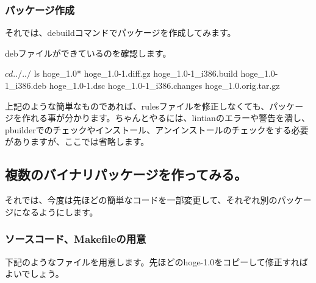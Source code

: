 \documentclass[mingoth,a4paper]{jsarticle}
\begin{document}
\subsubsection{パッケージ作成}
それでは、debuildコマンドでパッケージを作成してみます。

debファイルができているのを確認します。
\begin{commandline}
$ cd ../../
$ ls hoge_1.0*
hoge_1.0-1.diff.gz  hoge_1.0-1_i386.build    hoge_1.0-1_i386.deb
hoge_1.0-1.dsc      hoge_1.0-1_i386.changes  hoge_1.0.orig.tar.gz
\end{commandline}

上記のような簡単なものであれば、rulesファイルを修正しなくても、パッケー
ジを作れる事が分かります。ちゃんとやるには、lintianのエラーや警告を潰し、
pbuilderでのチェックやインストール、アンインストールのチェックをする必要
がありますが、ここでは省略します。

\subsection{複数のバイナリパッケージを作ってみる。}
それでは、今度は先ほどの簡単なコードを一部変更して、それぞれ別のパッケー
ジになるようにします。

\subsubsection{ソースコード、Makefileの用意}
下記のようなファイルを用意します。先ほどのhoge-1.0をコピーして修正すれば
よいでしょう。
\end{document}
